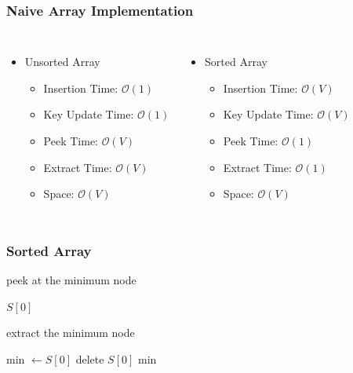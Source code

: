\documentclass{beamer}
\begin{document}
\begin{frame}
	\frametitle{Naive Array Implementation} 
	\begin{columns}
	\begin{itemize}
		\item Unsorted Array
		\begin{itemize}
			\item Insertion Time: \( \mathcal{O}(1) \) 			
			\item Key Update Time: \( \mathcal{O}(1) \) 
			\item Peek Time: \( \mathcal{O}(V) \) 
			\item Extract Time: \( \mathcal{O}(V) \) 
			\item Space: \( \mathcal{O}(V) \) 
		\end{itemize}
	\end{itemize}
	
	\begin{itemize}
		\item Sorted Array
		\begin{itemize}
			\item Insertion Time: \( \mathcal{O}(V) \) 
			\item Key Update Time: \( \mathcal{O}(V) \) 
			\item Peek Time: \( \mathcal{O}(1) \) 
			\item Extract Time: \( \mathcal{O}(1) \) 
			\item Space: \( \mathcal{O}(V) \) 
		\end{itemize}
	\end{itemize}
	\end{columns}
\end{frame}

\begin{frame}
	\frametitle{Sorted Array}
	\begin{algorithm}[H]
		\caption{peek at the minimum node}
		\begin{algorithmic}[1]
			\State \Return $S[0]$
		\EndFunction
		\end{algorithmic}
	\end{algorithm}

	\begin{algorithm}[H]
		\caption{extract the minimum node}
		\begin{algorithmic}[1]
		\State min \( \leftarrow S[0]\) 
		\State delete $S[0]$
		\State \Return min
		\EndFunction
		\end{algorithmic}
	\end{algorithm}
\end{frame}
\end{document}
